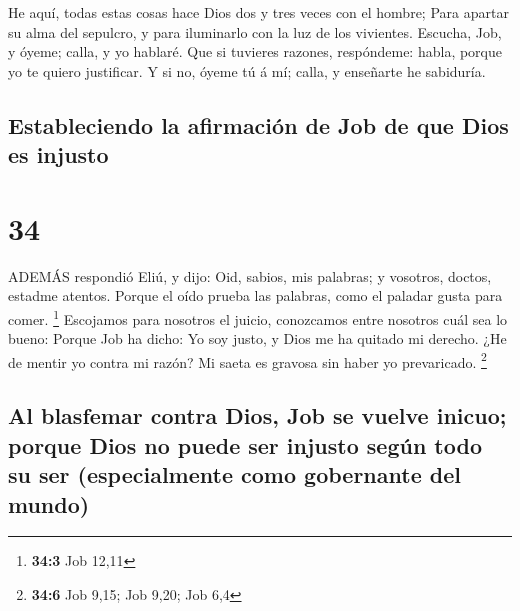  He aquí, todas estas cosas hace Dios dos y tres veces con
el hombre;  Para apartar su alma del sepulcro, y para
iluminarlo con la luz de los vivientes.  Escucha, Job, y
óyeme; calla, y yo hablaré.  Que si tuvieres razones,
respóndeme: habla, porque yo te quiero justificar.  Y si
no, óyeme tú á mí; calla, y enseñarte he sabiduría.

\hypertarget{estableciendo-la-afirmaciuxf3n-de-job-de-que-dios-es-injusto}{%
\subsection{Estableciendo la afirmación de Job de que Dios es
injusto}\label{estableciendo-la-afirmaciuxf3n-de-job-de-que-dios-es-injusto}}

\hypertarget{section-33}{%
\section{34}\label{section-33}}

 ADEMÁS respondió Eliú, y dijo:  Oid, sabios,
mis palabras; y vosotros, doctos, estadme atentos.  Porque
el oído prueba las palabras, como el paladar gusta para comer.
\footnote{\textbf{34:3} Job 12,11}  Escojamos para nosotros
el juicio, conozcamos entre nosotros cuál sea lo bueno: 
Porque Job ha dicho: Yo soy justo, y Dios me ha quitado mi derecho.
 ¿He de mentir yo contra mi razón? Mi saeta es gravosa sin
haber yo prevaricado. \footnote{\textbf{34:6} Job 9,15; Job 9,20; Job
  6,4}

\hypertarget{al-blasfemar-contra-dios-job-se-vuelve-inicuo-porque-dios-no-puede-ser-injusto-seguxfan-todo-su-ser-especialmente-como-gobernante-del-mundo}{%
\subsection{Al blasfemar contra Dios, Job se vuelve inicuo; porque Dios
no puede ser injusto según todo su ser (especialmente como gobernante
del
mundo)}\label{al-blasfemar-contra-dios-job-se-vuelve-inicuo-porque-dios-no-puede-ser-injusto-seguxfan-todo-su-ser-especialmente-como-gobernante-del-mundo}}

